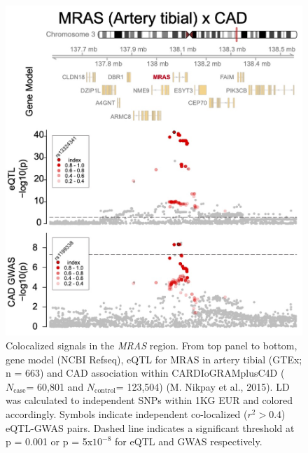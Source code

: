 \documentclass[11pt]{article}
\newcommand{\Ncase}{$N_{\textrm{case}}$\xspace}
\newcommand{\Ncontrol}{$N_{\textrm{control}}$\xspace}
\begin{document}
\begin{figure}[!ht]
  \centering
  \includegraphics[width=.7\textwidth]{figs/region_mras.jpg}
  \caption{Colocalized signals in the \emph{MRAS} region. From top panel to
    bottom, gene model (NCBI Refseq), eQTL for MRAS in artery tibial
    (GTEx; n = 663) and CAD association within CARDIoGRAMplusC4D
    (\Ncase = 60,801 and \Ncontrol = 123,504) (M. Nikpay et al.,
    2015). LD was calculated to independent SNPs within 1KG EUR and
    colored accordingly. Symbols indicate independent co-localized
    ($r^2 > 0.4$) eQTL-GWAS pairs. Dashed line indicates a significant
    threshold at p = 0.001 or p = 5x$10^{-8}$ for eQTL and GWAS
    respectively.}
\end{figure}
\end{document}
